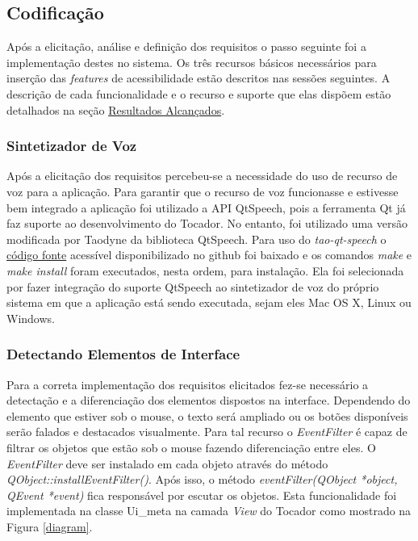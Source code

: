 \subsection{Codificação}

Após a elicitação, análise e definição dos requisitos o passo seguinte foi a implementação destes no sistema. Os três recursos básicos necessários para inserção das \textit{features} de acessibilidade estão descritos nas sessões seguintes. A descrição de cada funcionalidade e o recurso e suporte que elas dispõem estão detalhados na seção \hyperref[cap4]{Resultados Alcançados}.

\subsubsection{Sintetizador de Voz}

Após a elicitação dos requisitos percebeu-se a necessidade do uso de recurso de voz para a aplicação. Para garantir que o recurso de voz funcionasse e estivesse bem integrado a aplicação foi utilizado a API QtSpeech, pois a ferramenta Qt já faz suporte ao desenvolvimento do Tocador. No entanto, foi utilizado uma versão modificada por Taodyne da biblioteca QtSpeech. Para uso do \textit{tao-qt-speech} o \href{https://github.com/c3d/tao-qt-speech.git}{código fonte} acessível disponibilizado no github foi baixado e os comandos \textit{make} e \textit{make install} foram executados, nesta ordem, para instalação. Ela foi selecionada por fazer integração do suporte QtSpeech ao sintetizador de voz do próprio sistema em que a aplicação está sendo executada, sejam eles Mac OS X, Linux ou Windows.


\subsubsection{Detectando Elementos de Interface}\label{detect}

Para a correta implementação dos requisitos elicitados fez-se necessário a detectação e a diferenciação dos elementos dispostos na interface. Dependendo do elemento que estiver sob o mouse, o texto será ampliado ou os botões disponíveis serão falados e destacados visualmente. Para tal recurso o \textit{EventFilter} é capaz de filtrar os objetos que estão sob o mouse fazendo diferenciação entre eles. O \textit{EventFilter} deve ser instalado em cada objeto através do método \textit{QObject::installEventFilter()}. Após isso, o método \textit{eventFilter(QObject *object, QEvent *event)} fica responsável por escutar os objetos. Esta funcionalidade foi implementada na classe Ui\_meta na camada \textit{View} do Tocador como mostrado na Figura \ref{diagram}.

